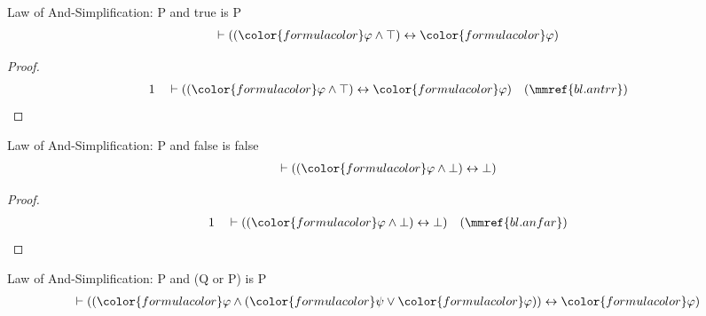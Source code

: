 \begin{lemma} Law of And-Simplification:  P and true
is P
\begin{align}
\vdash ( ( {\color{formulacolor}\varphi} \wedge \top ) \leftrightarrow
    {\color{formulacolor}\varphi} )\label{bl.PandTrueisP}
\end{align}
\end{lemma}

\begin{proof}
\begin{align}
  1 && & \vdash ( ( {\color{formulacolor}\varphi} \wedge \top ) \leftrightarrow
      {\color{formulacolor}\varphi}
      )&(\mmref{bl.antrr})\notag
\end{align}
\end{proof}

\begin{lemma} Law of And-Simplification:  P and
false is false
\begin{align}
\vdash ( ( {\color{formulacolor}\varphi} \wedge \bot ) \leftrightarrow \bot
    )\label{bl.PandFalseisFalse}
\end{align}
\end{lemma}

\begin{proof}
\begin{align}
  1 && & \vdash ( ( {\color{formulacolor}\varphi} \wedge \bot ) \leftrightarrow
      \bot )&(\mmref{bl.anfar})\notag
\end{align}
\end{proof}

\begin{lemma} Law of And-Simplification:  P and (Q
or P) is P
\begin{align}
\vdash ( ( {\color{formulacolor}\varphi} \wedge ( {\color{formulacolor}\psi}
    \vee {\color{formulacolor}\varphi} ) ) \leftrightarrow
    {\color{formulacolor}\varphi} )\label{bl.PandQorPisP}
\end{align}
\end{lemma}


